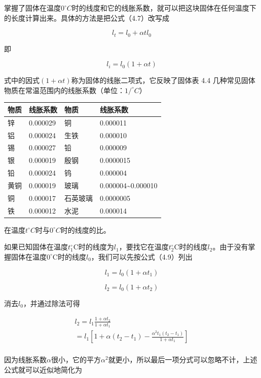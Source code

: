 掌握了固体在温度\(0^{\circ}C\)时的线度和它的线胀系数，就可以把这块固体在任何温度下的长度计算出来。具体的方法是把公式（4.7）改写成

\[
l_t=l_0+\alpha t l_0
\]

即

\[
l _ {i} = l _ {0} (1 + \alpha t) \tag {4.9}
\]

式中的因式\((1+\alpha t)\)称为固体的线胀二项式，它反映了固体表 4.4
几种常见固体物质在常温范围内的线胀系数（单位：\(1/^{\circ}C\)）

{\def\LTcaptype{none} %
\begin{longtable}[]{@{}llll@{}}
\toprule\noalign{}
物质 & 线胀系数 & 物质 & 线胀系数 \\
\midrule\noalign{}
\endhead
\bottomrule\noalign{}
\endlastfoot
锌 & 0.000029 & 铜 & 0.000011 \\
铝 & 0.000024 & 生铁 & 0.000010 \\
锡 & 0.000027 & 铅 & 0.000009 \\
银 & 0.000019 & 殷钢 & 0.0000015 \\
铅 & 0.000024 & 钨 & 0.000004 \\
黄铜 & 0.000019 & 玻璃 & 0.000004\textasciitilde0.000010 \\
铜 & 0.000017 & 石英玻璃 & 0.0000005 \\
铁 & 0.000012 & 水泥 & 0.000014 \\
\end{longtable}
}

在温度\(t^{\circ}C\)时与\(0^{\circ}C\)时的线度的比。

如果已知固体在温度\(t_1^\circ \mathrm{C}\)时的线度为\(l_{1}\)，要找它在温度\(t_2^\circ \mathrm{C}\)时的线度\(l_{2}\)。由于没有掌握固体在温度\(0^\circ \mathrm{C}\)时的线度\(l_{0}\)，我们可以先按公式（4.9）列出

\[
l _ {1} = l _ {0} (1 + \alpha t _ {1})
\]

\[
l_2=l_0(1+\alpha t_2)
\]

消去\(l_{0}\)，并通过除法可得

\[
\begin{array}{l} l _ {2} = l _ {1} \frac {1 + \alpha t _ {2}}{1 + \alpha t _ {1}} \\ = l _ {1} \left[ 1 + \alpha \left(t _ {2} - t _ {1}\right) - \frac {\alpha^ {2} t _ {1} \left(t _ {2} - t _ {1}\right)}{1 + \alpha t _ {1}} \right] \\ \end{array}
\]

因为线胀系数\(\alpha\)很小，它的平方\(\alpha^{2}\)就更小，所以最后一项分式可以忽略不计，上述公式就可以近似地简化为

